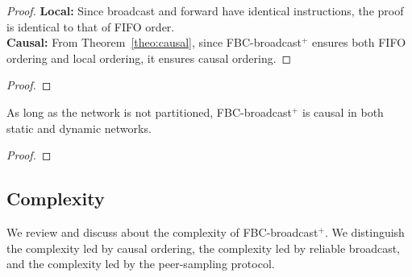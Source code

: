 \begin{proof}
  \textbf{Local:} Since broadcast and forward have identical instructions, the
  proof is identical to that of FIFO order. \\
  \textbf{Causal:} From Theorem~\ref{theo:causal}, since FBC-broadcast$^+$
  ensures both FIFO ordering and local ordering, it ensures causal ordering.
\end{proof}

\begin{theorem}
\end{theorem}

\begin{proof}
\end{proof}

\begin{theorem}
  As long as the network is not partitioned, FBC-broadcast$^+$ is causal in both
  static and dynamic networks.
\end{theorem}

\begin{proof}
\end{proof}

\subsection{Complexity}
\label{subsec:complexity}

We review and discuss about the complexity of FBC-broadcast$^+$. We distinguish
the complexity led by causal ordering, the complexity led by reliable
broadcast, and the complexity led by the peer-sampling protocol.


